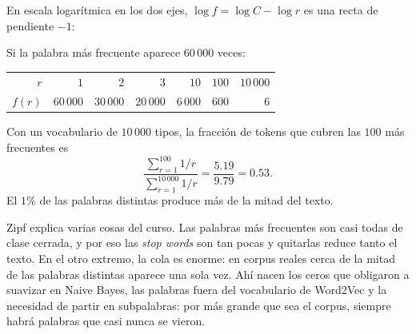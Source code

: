\documentclass[11pt,letterpaper]{article}
\begin{document}
En escala logarítmica en los dos ejes, $\log f = \log C - \log r$ es
una recta de pendiente $-1$:

\begin{center}
\end{center}

\begin{ejemplo}
    Si la palabra más frecuente aparece $60\,000$ veces:
    \begin{center}
    \begin{tabular}{rrrrrrr}
        \toprule
        $r$ & $1$ & $2$ & $3$ & $10$ & $100$ & $10\,000$ \\
        $f(r)$ & $60\,000$ & $30\,000$ & $20\,000$ & $6\,000$ & $600$
               & $6$ \\
        \bottomrule
    \end{tabular}
    \end{center}
    Con un vocabulario de $10\,000$ tipos, la fracción de tokens que
    cubren las $100$ más frecuentes es
    \[
        \frac{\sum_{r=1}^{100} 1/r}{\sum_{r=1}^{10\,000} 1/r}
        = \frac{5.19}{9.79} = 0.53 .
    \]
    El $1\%$ de las palabras distintas produce más de la mitad del
    texto.
\end{ejemplo}

\begin{idea}
    Zipf explica varias cosas del curso. Las palabras más frecuentes
    son casi todas de clase cerrada, y por eso las \textit{stop words}
    son tan pocas y quitarlas reduce tanto el texto. En el otro
    extremo, la cola es enorme: en corpus reales cerca de la mitad de
    las palabras distintas aparece una sola vez. Ahí nacen los ceros
    que obligaron a suavizar en Naive Bayes, las palabras fuera del
    vocabulario de Word2Vec y la necesidad de partir en subpalabras:
    por más grande que sea el corpus, siempre habrá palabras que casi
    nunca se vieron.
\end{idea}
\end{document}
